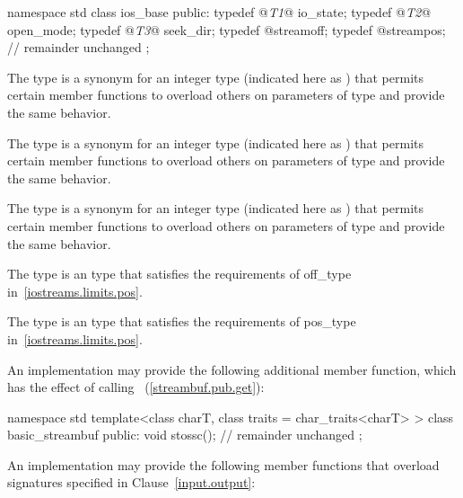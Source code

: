 \begin{codeblock}
namespace std {
  class ios_base {
  public:
    typedef @\textit{T1}@ io_state;
    typedef @\textit{T2}@ open_mode;
    typedef @\textit{T3}@ seek_dir;
    typedef @\impdef@ streamoff;
    typedef @\impdef@ streampos;
    // remainder unchanged
  };
}
\end{codeblock}

\pnum
The type  is a synonym for an integer type
(indicated here as  ) that permits certain member functions to
overload others on parameters of type  and provide the
same behavior.

\pnum
The type  is a synonym for an integer type
(indicated here as  ) that permits certain member functions to
overload others on parameters of type  and provide the
same behavior.

\pnum
The type  is a synonym for an integer type
(indicated here as  ) that permits certain member functions to
overload others on parameters of type  and provide the
same behavior.

\pnum
The type
%
is an
 type
that satisfies the requirements of
off_type in~\ref{iostreams.limits.pos}.

\pnum
The type
is an
 type
that satisfies the requirements of
pos_type in~\ref{iostreams.limits.pos}.

\pnum
An implementation may provide the following additional member function, which has the
effect of calling
~(\ref{streambuf.pub.get}):

\begin{codeblock}
namespace std {
  template<class charT, class traits = char_traits<charT> >
  class basic_streambuf {
  public:
    void stossc();
    // remainder unchanged
  };
}
\end{codeblock}

\pnum
An implementation may provide the following member functions that overload signatures
specified in Clause~\ref{input.output}:

